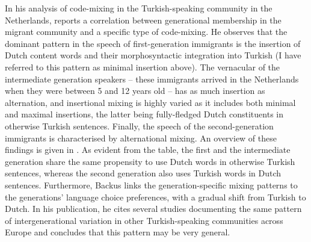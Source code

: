 In his analysis of code-mixing in the Turkish-speaking community in the Netherlands, \citet[][387--391]{backus-two-1996} reports a correlation between generational membership in the migrant community and a specific type of code-mixing. He observes that the dominant pattern in the speech of first-generation immigrants is the insertion of Dutch content words and their morphosyntactic integration into Turkish (I have referred to this pattern as minimal insertion above). The vernacular of the intermediate generation speakers -- these immigrants arrived in the Netherlands when they were between 5 and 12 years old -- has as much insertion as alternation, and insertional mixing is highly varied as it includes both minimal and maximal insertions, the latter being fully-fledged Dutch constituents in otherwise Turkish sentences. Finally, the speech of the second-generation immigrants is characterised by alternational mixing. An overview of these findings is given in . As evident from the table, the first and the intermediate generation share the same propensity to use Dutch words in otherwise Turkish sentences, whereas the second generation also uses Turkish words in Dutch sentences. Furthermore, Backus links the generation-specific mixing patterns to the generations' language choice preferences, with a gradual shift from Turkish to Dutch. In his \citeyear[][]{backus06} publication, he cites several studies documenting the same pattern of intergenerational variation in other Turkish-speaking communities across Europe and concludes that this pattern may be very general. 

\begin{table}
\caption{Distribution of main types of code-mixing, and base language in code-mixing across first, intermediate, and second generations in Turkish-Dutch code-mixing data \citep[adapted from][702]{backus06}}
\label{tab:1:1}
\end{table}


